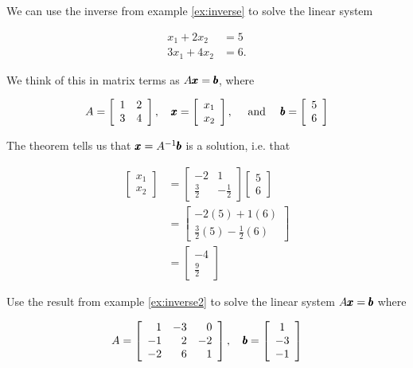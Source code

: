 \begin{example}
We can use the inverse from example \ref{ex:inverse} to solve the linear system

\[
\begin{aligned}
x_1+2 x_2 & =5 \\
3 x_1+4 x_2 & =6 .
\end{aligned}
\]

We think of this in matrix terms as \(A \pmb{x}=\pmb{b}\), where

\[
A=\left[\begin{array}{ll}
1 & 2 \\
3 & 4
\end{array}\right], \quad \pmb{x}=\left[\begin{array}{l}
x_1 \\
x_2
\end{array}\right], \quad \text { and } \quad \pmb{b}=\left[\begin{array}{l}
5 \\
6
\end{array}\right]
\]

The theorem tells us that \(\pmb{x}=A^{-1} \pmb{b}\) is a solution, i.e. that

\[
\begin{aligned}
{\left[\begin{array}{l}
x_1 \\
x_2
\end{array}\right] } & =\left[\begin{array}{cc}
-2 & 1 \\
\frac{3}{2} & -\frac{1}{2}
\end{array}\right]\left[\begin{array}{l}
5 \\
6
\end{array}\right] \\
& =\left[\begin{array}{c}
-2(5)+1(6) \\
\frac{3}{2}(5)-\frac{1}{2}(6)
\end{array}\right] \\
& =\left[\begin{array}{c}
-4 \\
\frac{9}{2}
\end{array}\right]
\end{aligned}
\]
\end{example}

\begin{example} Use the result from example \ref{ex:inverse2} to solve the linear system $A \pmb{x} = \pmb{b}$ where

    \[A=\left[\begin{array}{rrr}1 & -3 & 0 \\ -1 & 2 & -2 \\ -2 & 6 & 1\end{array}\right], \quad \pmb{b}=\left[\begin{array}{c}1 \\ -3 \\ -1\end{array}\right]\]

\end{example}

